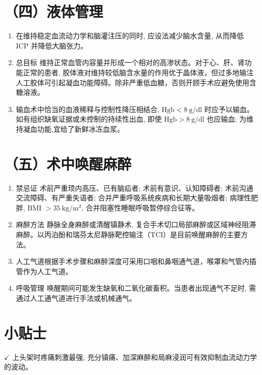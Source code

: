 \documentclass[10pt]{article}
\begin{document}
\section*{（四）液体管理}
\begin{enumerate}
  \item 在维持稳定血流动力学和脑灌注压的同时, 应设法减少脑水含量, 从而降低 ICP 并降低大脑张力。

  \item 总目标 维持正常血管内容量并形成一个相对的高渗状态。对于心、肝、肾功能正常的患者, 胶体液对维持较低脑含水量的作用优于晶体液，但过多地输注人工胶体可引起凝血功能障碍。除非严重低血糖，否则开顾手术应避免使用含糖溶液。

  \item 输血术中恰当的血液稀释与控制性降压相结合, $\mathrm{Hgb}<8 \mathrm{~g} / \mathrm{dl}$ 时应予以输血。如有组织缺氧证据或未控制的持续性出血, 即使 $\mathrm{Hgb}>8 \mathrm{~g} / \mathrm{dl}$ 也应输血; 为维持凝血功能,宜给了新鲜冰冻血浆。

\end{enumerate}

\section*{（五）术中唤醒麻醉}
\begin{enumerate}
  \item 禁忌证 术前严重顼内高压、已有脑疝者; 术前有意识、认知障碍者; 术前沟通交流障碍、有严重失语者; 合并严重呼吸系统疾病和长期大量吸烟者; 病理性肥胖, BMI $>35 \mathrm{~kg} / \mathrm{m}^{2}$, 合并阻塞性睡眠呼吸暂停综合征等。

  \item 麻醉方法 静脉全身麻醉或清醒镇静术, 复合手术切口局部麻醉或区域神经阻滞麻醉。以丙泊酚和瑞芬太尼静脉靶控输注（TCI）是目前唤醒麻醉的主要方法。

  \item 人工气道根据手术步骤和麻醉深度可采用口咽和鼻咽通气道，喉罩和气管内插管作为人工气道。

  \item 呼吸管理 唤醒期间可能发生缺氧和二氧化碳畜积。当患者出现通气不足时, 需通过人工通气道进行手法或机械通气。

\end{enumerate}

\section*{小贴士}
$\checkmark$ 上头架时疼痛刺激最强, 充分镇痛、加深麻醉和局麻浸润可有效抑制血流动力学的波动。
\end{document}
